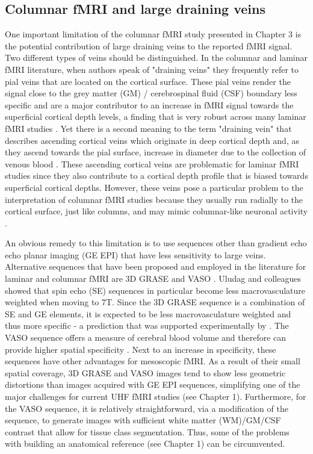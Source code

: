 \subsection{Columnar fMRI and large draining veins}
One important limitation of the columnar fMRI study presented in Chapter 3 is the potential contribution of large draining veins to the reported fMRI signal. Two different types of veins should be distinguished. In the columnar and laminar fMRI literature, when authors speak of "draining veins" they frequently refer to pial veins that are located on the cortical surface. These pial veins render the signal close to the grey matter (GM) / cerebrospinal fluid (CSF) boundary less specific \parencite{Polimeni2010, Moerel2017} and are a major contributor to an increase in fMRI signal towards the superficial cortical depth levels, a finding that is very robust across many laminar fMRI studies \parencite{Ress2007, Koopmans2010, Polimeni2010, Koopmans2011, DeMartino2013, Marquardt2018}. Yet there is a second meaning to the term "draining vein" that describes ascending cortical veins which originate in deep cortical depth and, as they ascend towards the pial surface, increase in diameter due to the collection of venous blood \parencite{Duvernoy1981}. These ascending cortical veins are problematic for laminar fMRI studies since they also contribute to a cortical depth profile that is biased towards superficial cortical depths. However, these veins pose a particular problem to the interpretation of columnar fMRI studies because they usually run radially to the cortical surface, just like columns, and may mimic columnar-like neuronal activity \parencite{DeMartino2016}.

An obvious remedy to this limitation is to use sequences other than gradient echo echo planar imaging (GE EPI) that have less sensitivity to large veins. Alternative sequences that have been proposed and employed in the literature for laminar and columnar fMRI are 3D GRASE \parencite{Feinberg2008, Zimmermann2011, DeMartino2013, Kemper2015, Moerel2017} and VASO \parencite{Huber2015, Huber2017}. Uludag and colleagues \parencite*{Uludag2009} showed that spin echo (SE) sequences in particular become less macrovasculature weighted when moving to 7T. Since the 3D GRASE sequence is a combination of SE and GE elements, it is expected to be less macrovasculature weighted and thus more specific - a prediction that was supported experimentally by \cite{DeMartino2013}. The VASO sequence offers a measure of cerebral blood volume and therefore can provide higher spatial specificity \parencite{Huber2015, Huber2017}. Next to an increase in specificity, these sequences have other advantages for mesoscopic fMRI. As a result of their small spatial coverage, 3D GRASE and VASO images tend to show less geometric distortions than images acquired with GE EPI sequences, simplifying one of the major challenges for current UHF fMRI studies (see Chapter 1). Furthermore, for the VASO sequence, it is relatively straightforward, via a modification of the sequence, to generate images with sufficient white matter (WM)/GM/CSF contrast that allow for tissue class segmentation. Thus, some of the problems with building an anatomical reference (see Chapter 1) can be circumvented.

